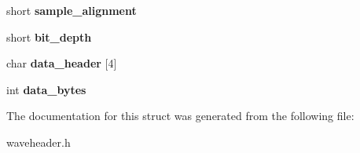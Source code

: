 \begin{DoxyCompactItemize}
short {\bfseries sample\+\_\+alignment}
\item 
\mbox{\label{structwav__header_a63fa60069060bae97c8a64c5b37afa23}} 
short {\bfseries bit\+\_\+depth}
\item 
\mbox{\label{structwav__header_ae43fac12459053e98a80e3879c5cd2a7}} 
char {\bfseries data\+\_\+header} \mbox{[}4\mbox{]}
\item 
\mbox{\label{structwav__header_a3eeeca270947eab7c7aaee61bbee9b0e}} 
int {\bfseries data\+\_\+bytes}
\end{DoxyCompactItemize}


The documentation for this struct was generated from the following file\+:\begin{DoxyCompactItemize}
\item 
waveheader.\+h\end{DoxyCompactItemize}
